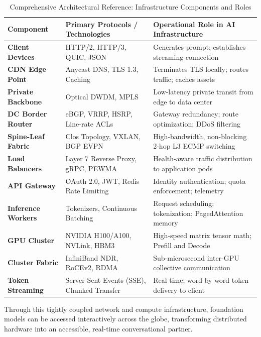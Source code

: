 \documentclass[12pt,a4paper]{report}
\begin{document}
\begin{table}[H]
\centering
\caption{Comprehensive Architectural Reference: Infrastructure Components and Roles}
\label{tab:master_summary}
\begin{tabularx}{\textwidth}{lXX}
\toprule
\textbf{Component} & \textbf{Primary Protocols / Technologies} & \textbf{Operational Role in AI Infrastructure} \\
\midrule
\textbf{Client Devices} & HTTP/2, HTTP/3, QUIC, JSON & Generates prompt; establishes streaming connection \\
\textbf{CDN Edge Point} & Anycast DNS, TLS 1.3, Caching & Terminates TLS locally; routes traffic; caches assets \\
\textbf{Private Backbone} & Optical DWDM, MPLS & Low-latency private transit from edge to data center \\
\textbf{DC Border Router} & eBGP, VRRP, HSRP, Line-rate ACLs & Gateway redundancy; route optimization; DDoS filtering \\
\textbf{Spine-Leaf Fabric} & Clos Topology, VXLAN, BGP EVPN & High-bandwidth, non-blocking 2-hop L3 ECMP switching \\
\textbf{Load Balancers} & Layer 7 Reverse Proxy, gRPC, PEWMA & Health-aware traffic distribution to application pods \\
\textbf{API Gateway} & OAuth 2.0, JWT, Redis Rate Limiting & Identity authentication; quota enforcement; telemetry \\
\textbf{Inference Workers} & Tokenizers, Continuous Batching & Request scheduling; tokenization; PagedAttention memory \\
\textbf{GPU Cluster} & NVIDIA H100/A100, NVLink, HBM3 & High-speed matrix tensor math; Prefill and Decode \\
\textbf{Cluster Fabric} & InfiniBand NDR, RoCEv2, RDMA & Sub-microsecond inter-GPU collective communication \\
\textbf{Token Streaming} & Server-Sent Events (SSE), Chunked Transfer & Real-time, word-by-word token delivery to client \\
\bottomrule
\end{tabularx}
\end{table}

Through this tightly coupled network and compute infrastructure, foundation models can be accessed interactively across the globe, transforming distributed hardware into an accessible, real-time conversational partner.
\end{document}
